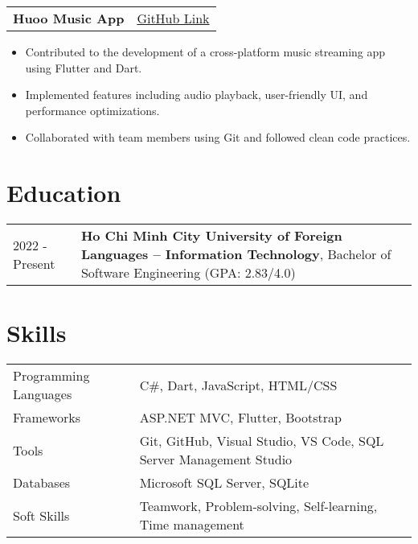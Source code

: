 \documentclass[a4paper,12pt]{article}
\begin{document}
\vspace{1em}
\begin{tabularx}{\linewidth}{@{}l r@{}}
\textbf{Huoo Music App} & \hfill \href{https://github.com/FoxeiZ/huoo}{GitHub Link} \\[3.75pt]
\end{tabularx}
\vspace{-0.5em}
\begin{itemize}[leftmargin=1.5em]
    \item Contributed to the development of a cross-platform music streaming app using Flutter and Dart.
    \item Implemented features including audio playback, user-friendly UI, and performance optimizations.
    \item Collaborated with team members using Git and followed clean code practices.
\end{itemize}

\section{Education}
\begin{tabularx}{\linewidth}{@{}l X@{}}
2022 - Present & \textbf{Ho Chi Minh City University of Foreign Languages – Information Technology}, Bachelor of Software Engineering \hfill (GPA: 2.83/4.0) \\
\end{tabularx}

\section{Skills}
\begin{tabularx}{\linewidth}{@{}l X@{}}
Programming Languages & C\#, Dart, JavaScript, HTML/CSS \\
Frameworks & ASP.NET MVC, Flutter, Bootstrap \\
Tools & Git, GitHub, Visual Studio, VS Code, SQL Server Management Studio \\
Databases & Microsoft SQL Server, SQLite \\
Soft Skills & Teamwork, Problem-solving, Self-learning, Time management \\
\end{tabularx}

\vfill
{}
\end{document}
